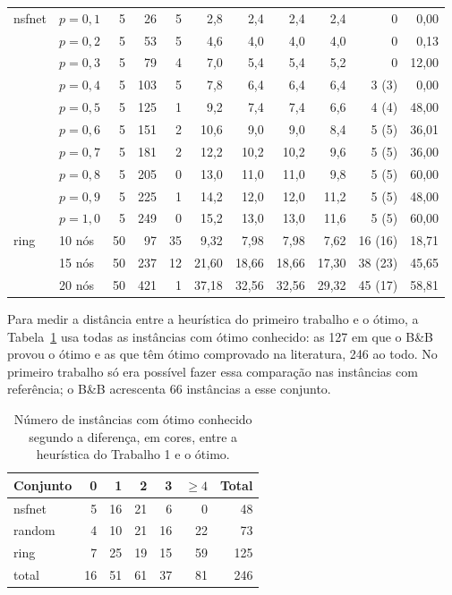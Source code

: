 \documentclass[12pt]{article}
\begin{document}
\begin{table}[ht]
\begin{tabular}{llrrrrrrrrr}
    \midrule
    nsfnet & $p=0{,}1$ & 5 & 26  & 5 & 2,8  & 2,4  & 2,4  & 2,4  & 0     & 0,00 \\
           & $p=0{,}2$ & 5 & 53  & 5 & 4,6  & 4,0  & 4,0  & 4,0  & 0     & 0,13 \\
           & $p=0{,}3$ & 5 & 79  & 4 & 7,0  & 5,4  & 5,4  & 5,2  & 0     & 12,00 \\
           & $p=0{,}4$ & 5 & 103 & 5 & 7,8  & 6,4  & 6,4  & 6,4  & 3 (3) & 0,00 \\
           & $p=0{,}5$ & 5 & 125 & 1 & 9,2  & 7,4  & 7,4  & 6,6  & 4 (4) & 48,00 \\
           & $p=0{,}6$ & 5 & 151 & 2 & 10,6 & 9,0  & 9,0  & 8,4  & 5 (5) & 36,01 \\
           & $p=0{,}7$ & 5 & 181 & 2 & 12,2 & 10,2 & 10,2 & 9,6  & 5 (5) & 36,00 \\
           & $p=0{,}8$ & 5 & 205 & 0 & 13,0 & 11,0 & 11,0 & 9,8  & 5 (5) & 60,00 \\
           & $p=0{,}9$ & 5 & 225 & 1 & 14,2 & 12,0 & 12,0 & 11,2 & 5 (5) & 48,00 \\
           & $p=1{,}0$ & 5 & 249 & 0 & 15,2 & 13,0 & 13,0 & 11,6 & 5 (5) & 60,00 \\
    \midrule
    ring   & 10 nós & 50 & 97  & 35 & 9,32  & 7,98  & 7,98  & 7,62  & 16 (16) & 18,71 \\
           & 15 nós & 50 & 237 & 12 & 21,60 & 18,66 & 18,66 & 17,30 & 38 (23) & 45,65 \\
           & 20 nós & 50 & 421 & 1  & 37,18 & 32,56 & 32,56 & 29,32 & 45 (17) & 58,81 \\
    \bottomrule
  \end{tabular}
\end{table}

Para medir a distância entre a heurística do primeiro trabalho e o ótimo, a
Tabela~\ref{tab:t1otimo} usa todas as instâncias com ótimo conhecido: as 127
em que o B\&B provou o ótimo e as que têm ótimo comprovado na literatura,
246 ao todo. No primeiro trabalho só era possível fazer essa comparação nas
instâncias com referência; o B\&B acrescenta 66 instâncias a esse conjunto.

\begin{table}[ht]
  \centering
  \caption{Número de instâncias com ótimo conhecido segundo a diferença, em
    cores, entre a heurística do Trabalho 1 e o ótimo.}
  \label{tab:t1otimo}
  \small
  \begin{tabular}{lrrrrrr}
    \toprule
    Conjunto & 0 & 1 & 2 & 3 & $\ge4$ & Total \\
    \midrule
    nsfnet & 5  & 16 & 21 & 6  & 0  & 48  \\
    random & 4  & 10 & 21 & 16 & 22 & 73  \\
    ring   & 7  & 25 & 19 & 15 & 59 & 125 \\
    \midrule
    total  & 16 & 51 & 61 & 37 & 81 & 246 \\
    \bottomrule
  \end{tabular}
\end{table}
\end{document}
